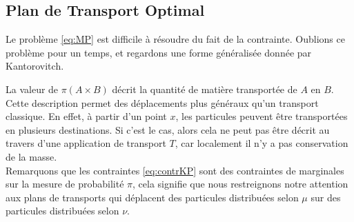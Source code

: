 \documentclass[a4paper,12pt]{article}
\begin{document}
\subsection{Plan de Transport Optimal}
Le problème \eqref{eq:MP} est difficile à résoudre du fait de la contrainte. Oublions ce problème pour un temps, et regardons une forme généralisée donnée par Kantorovitch. \\

\vspace{0.3cm}

La valeur de $\pi (A\times B)$ décrit la quantité de matière transportée de $A$ en $B$. Cette description permet des déplacements plus généraux qu'un transport classique. En effet, à partir d'un point $x$, les particules peuvent être transportées en plusieurs destinations. Si c'est le cas, alors cela ne peut pas être décrit au travers d'une application de transport $T$, car localement il n'y a pas conservation de la masse.\\
Remarquons que les contraintes \eqref{eq:contrKP} sont des contraintes de marginales sur la mesure de probabilité $\pi$, cela signifie que nous restreignons notre attention aux plans de transports qui déplacent des particules distribuées selon $\mu$ sur des particules distribuées selon $\nu$.
\end{document}
